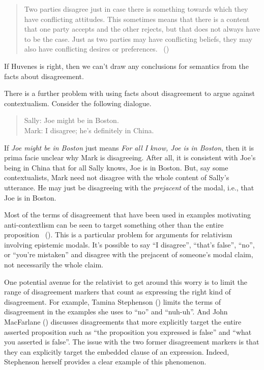 \documentclass[
  10pt,
  letterpaper,
  DIV=11,
  numbers=noendperiod,
  twoside]{scrartcl}
\begin{document}
\begin{quote}
Two parties disagree just in case there is something towards which they
have conflicting attitudes. This sometimes means that there is a content
that one party accepts and the other rejects, but that does not always
have to be the case. Just as two parties may have conflicting beliefs,
they may also have conflicting desires or preferences.
~()
\end{quote}

If Huvenes is right, then we can't draw any conclusions for semantics
from the facts about disagreement.

There is a further problem with using facts about disagreement to argue
against contextualism. Consider the following dialogue.

\begin{quote}
Sally: Joe might be in Boston.\\
Mark: I disagree; he's definitely in China.
\end{quote}

If \emph{Joe might be in Boston} just means \emph{For all I know, Joe is
in Boston}, then it is prima facie unclear why Mark is disagreeing.
After all, it is consistent with Joe's being in China that for all Sally
knows, Joe is in Boston. But, say some contextualists, Mark need not
disagree with the whole content of Sally's utterance. He may just be
disagreeing with the \emph{prejacent} of the modal, i.e., that Joe is in
Boston.

Most of the terms of disagreement that have been used in examples
motivating anti-contextlism can be seen to target something other than
the entire proposition ~(). This is a particular problem for arguments for
relativism involving epistemic modals. It's possible to say ``I
disagree'', ``that's false'', ``no'', or ``you're mistaken'' and
disagree with the prejacent of someone's modal claim, not necessarily
the whole claim.

One potential avenue for the relativist to get around this worry is to
limit the range of disagreement markers that count as expressing the
right kind of disagreement. For example, Tamina Stephenson
() limits the terms of disagreement
in the examples she uses to ``no'' and ``nuh-uh''. And John MacFarlane
() discusses disagreements that
more explicitly target the entire asserted proposition such as ``the
proposition you expressed is false'' and ``what you asserted is false''.
The issue with the two former disagreement markers is that they can
explicitly target the embedded clause of an expression. Indeed,
Stephenson herself provides a clear example of this phenomenon.
\end{document}
